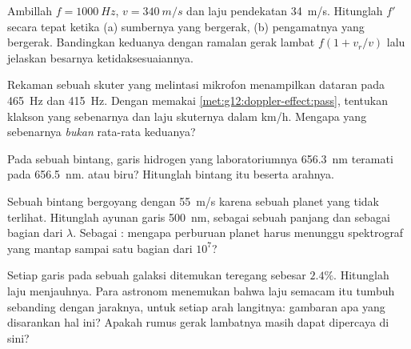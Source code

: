 \begin{exercise}[$\star\star$]\label{exo:g12:doppler-effect:9}
Ambillah $f = \qty{1000}{Hz}$, $v = \qty{340}{m/s}$ dan laju pendekatan \qty{34}{m/s}.
Hitunglah $f'$ secara tepat ketika (a) sumbernya yang bergerak, (b) pengamatnya yang
bergerak. Bandingkan keduanya dengan ramalan gerak lambat $f(1 + v_r/v)$ lalu jelaskan
besarnya ketidaksesuaiannya.
\end{exercise}

\begin{exercise}[$\star\star$]\label{exo:g12:doppler-effect:10}
Rekaman sebuah skuter yang melintasi mikrofon menampilkan dataran pada \qty{465}{Hz} dan
\qty{415}{Hz}. Dengan memakai \cref{met:g12:doppler-effect:pass}, tentukan 
klakson yang sebenarnya dan laju skuternya dalam \unit{km/h}. Mengapa  yang
sebenarnya \emph{bukan} rata-rata keduanya?
\end{exercise}

\begin{exercise}[$\star\star$]\label{exo:g12:doppler-effect:11}
Pada  sebuah bintang, garis hidrogen yang  laboratoriumnya
\qty{656.3}{nm} teramati pada \qty{656.5}{nm}.  atau biru? Hitunglah
 bintang itu beserta arahnya.
\end{exercise}

\begin{exercise}[$\star\star\star$]\label{exo:g12:doppler-effect:12}
Sebuah bintang bergoyang dengan \qty{55}{m/s} karena sebuah planet yang tidak terlihat.
Hitunglah  ayunan  garis \qty{500}{nm}, sebagai sebuah panjang
dan sebagai bagian dari $\lambda$. Sebagai : mengapa perburuan planet harus
menunggu spektrograf yang mantap sampai satu bagian dari $10^{7}$?
\end{exercise}

\begin{exercise}[$\star\star\star$]\label{exo:g12:doppler-effect:13}
Setiap garis pada  sebuah galaksi ditemukan teregang sebesar $2.4\%$. Hitunglah
laju menjauhnya. Para astronom menemukan bahwa laju semacam itu tumbuh sebanding dengan
jaraknya, untuk setiap arah langitnya: gambaran apa yang disarankan hal ini? Apakah rumus
gerak lambatnya masih dapat dipercaya di sini?
\end{exercise}

